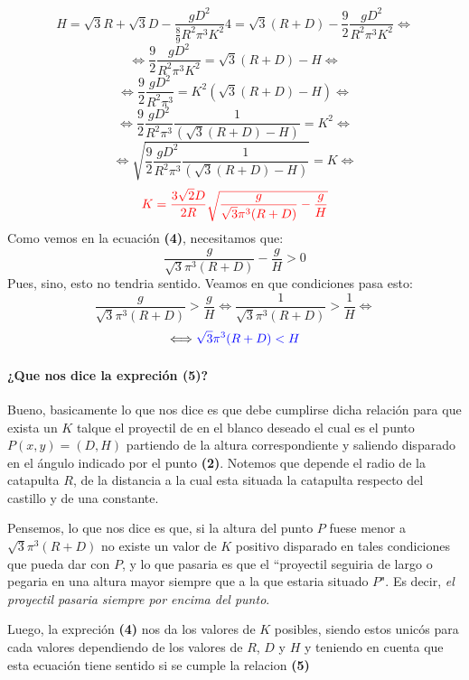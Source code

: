 \documentclass[fleqn,10pt]{SelfArx} %
\newcommand{\sii}{\Longleftrightarrow}
\newcommand{\azul}[1]{\color{blue}{#1}}
\newcommand{\rojo}[1]{\color{red}{#1}}
\begin{document}
\[H  = \sqrt{3}R + \sqrt{3} D - \frac{g D^2}{\frac{8}{9} R^2 {\pi}^3 K^2 }  4 =  \sqrt{3}(R +  D) - \frac{9}{2} \frac{g D^2}{ R^2 {\pi}^3 K^2 }  \sii \]
\[ \sii \frac{9}{2} \frac{g D^2}{ R^2 {\pi}^3 K^2 } = \sqrt{3}(R +  D) - H \sii\]
 \[ \sii \frac{9}{2} \frac{g D^2}{ R^2 {\pi}^3 } =K^2 \left( \sqrt{3}(R +  D) - H \right) \sii\]
\[\sii \frac{9}{2} \frac{g D^2}{ R^2 {\pi}^3 } \frac{1}{\left( \sqrt{3}(R +  D) - H \right)} =K^2  \sii \]
\[\sii \sqrt{\frac{9}{2} \frac{g D^2}{ R^2 {\pi}^3 } \frac{1}{\left( \sqrt{3}(R +  D) - H \right)}} =K \sii\]
\begin{equation}
\rojo{ K = \frac{3 \sqrt{2} D}{2 R} \sqrt{\frac{g}{\sqrt{3}{\pi}^3(R+D)} - \frac{g}{H}}}
\end{equation}
Como vemos en la ecuación \textbf{(4)}, necesitamos que:
\[\frac{g}{\sqrt{3}{\pi}^3(R+D)} - \frac{g}{H} > 0\]
Pues, sino, esto no tendria sentido. Veamos en que condiciones pasa esto:
\[\frac{g}{\sqrt{3}{\pi}^3(R+D)}  >  \frac{g}{H} \sii \frac{1}{\sqrt{3}{\pi}^3(R+D)}  >  \frac{1}{H} \sii \]
\begin{equation}
 \sii \azul{\sqrt{3}{\pi}^3(R+D)  <  H}  
\end{equation}

\paragraph{¿Que nos dice la expreción \textbf{(5)}?}{

Bueno, basicamente lo que nos dice es que debe cumplirse dicha relación para que exista un $K$ talque el proyectil de en el blanco deseado el cual es el punto $P(x,y)=(D,H)$ partiendo de la altura correspondiente y saliendo disparado en el ángulo indicado por el punto \textbf{(2)}. Notemos que depende el radio de la catapulta $R$, de la distancia a la cual esta situada la catapulta respecto del castillo y de una constante. 

Pensemos, lo que nos dice es que, si la altura del punto $P$ fuese menor a $\sqrt{3}{\pi}^3(R+D)$ no existe un valor de $K$ positivo disparado en tales condiciones que pueda dar con $P$, y lo que pasaria es que el ``proyectil seguiria de largo o pegaria en una altura mayor siempre que a la que estaria situado $P$". Es decir, \textit{el proyectil pasaria siempre por encima del punto}.
}

Luego, la expreción \textbf{(4)} nos da los valores de $K$ posibles, siendo estos unicós para cada valores dependiendo de los valores de $R$, $D$ y $H$ y teniendo en cuenta que esta ecuación tiene sentido si se cumple la relacion \textbf{(5)}
\end{document}
